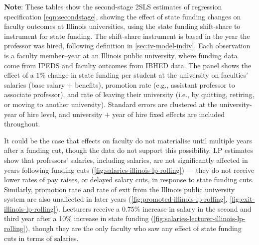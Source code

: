 \begin{table}[!htp]
    \singlespacing
    \centering
    \caption{Effects of State Funding on Faculty Salaries and Exit Rate, in IBHED Panel Data 2010--2021, 2SLS Estimates.}
    \label{tab:faculty-shock-illinois-rolling}
    \makebox[\textwidth][c]{}
    
    \makebox[\textwidth][c]{}

    \makebox[\textwidth][c]{}

    \justify
    \footnotesize
    \textbf{Note}: 
    These tables show the second-stage 2SLS estimates of regression specification \eqref{eqn:secondstage}, showing the effect of state funding changes on faculty outcomes at Illinois universities, using the state funding shift-share to instrument for state funding.
    The shift-share instrument is based in the year the professor was hired, following definition in \autoref{sec:iv-model-indiv}.
    Each observation is a faculty member--year at an Illinois public university, where funding data come from IPEDS and faculty outcomes from IBHED data.
    The panel shows the effect of a $1$\% change in state funding per student at the university on faculties' salaries (base salary $+$ benefits), promotion rate (e.g., assistant professor to associate professor), and rate of leaving their university (i.e., by quitting, retiring, or moving to another university).
    Standard errors are clustered at the university-year of hire level, and university $+$ year of hire fixed effects are included throughout.
\end{table}

It could be the case that effects on faculty do not materialise until multiple years after a funding cut, though the data do not support this possibility.
LP estimates show that professors' salaries, including salaries, are not significantly affected in years following funding cuts (\autoref{fig:salaries-illinois-lp-rolling}) --- they do not receive lower rates of pay raises, or delayed salary cuts, in response to state funding cuts.
Similarly, promotion rate and rate of exit from the Illinois public university system are also unaffected in later years (\autoref{fig:promoted-illinois-lp-rolling}, \ref{fig:exit-illinois-lp-rolling}).
Lecturers receive a 0.75\% increase in salary in the second and third year after a 10\% increase in state funding (\autoref{fig:salaries-lecturer-illinois-lp-rolling}), though they are the only faculty who saw any effect of state funding cuts in terms of salaries.

